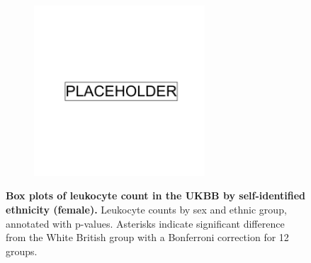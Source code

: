 \begin{figure}[ht]
    \centering
    \begin{subfigure}{\textwidth}
    \includegraphics[width=0.7\textwidth]{placeholder.png}
    \end{subfigure}
    \caption[Box plots of leukocyte count in the UKBB by self-identified ethnicity (female)]{\textbf{Box plots of leukocyte count in the UKBB by self-identified ethnicity (female).} Leukocyte counts by sex and ethnic group, annotated with p-values. Asterisks indicate significant difference from the White British group with a Bonferroni correction for 12 groups.}
    \label{fig:supp_box_leukocyte_f}
\end{figure}

\newpage

